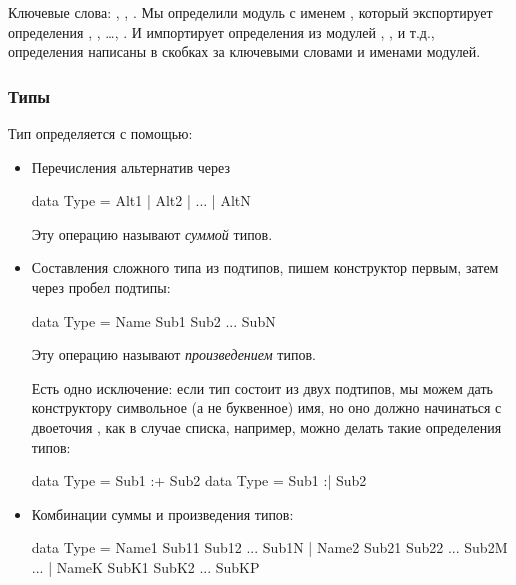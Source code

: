 Ключевые слова: , , . Мы определили
модуль с именем , который экспортирует определения
, , \dots , . И импортирует определения
из модулей , , и т.д.,
определения написаны в скобках за ключевыми словами  и
именами модулей.

\subsubsection{Типы}

Тип определяется с помощью:

\begin{itemize}

\item Перечисления альтернатив через \In{|} 
        
\begin{code}
data Type = Alt1 | Alt2 | ... | AltN
\end{code}

Эту операцию называют  \emph{суммой} типов.

\item Составления сложного типа из подтипов, пишем
        конструктор первым, затем через пробел подтипы:
   
\begin{code}
data Type = Name  Sub1  Sub2  ...  SubN
\end{code}

Эту операцию называют  \emph{произведением} типов.

Есть одно исключение: если тип состоит из двух подтипов,
мы можем дать конструктору символьное (а не буквенное) имя,
но оно должно начинаться с двоеточия \In{:}, как в случае списка,
например, можно делать такие определения типов:

\begin{code}
data Type = Sub1 :+ Sub2 
data Type = Sub1 :| Sub2 
\end{code}


\item Комбинации суммы и произведения типов:

\begin{code}
data Type = Name1  Sub11  Sub12  ...  Sub1N
          | Name2  Sub21  Sub22  ...  Sub2M
          ...
          | NameK  SubK1  SubK2  ...  SubKP
\end{code}

\end{itemize}

